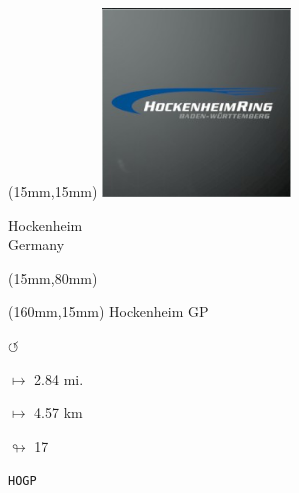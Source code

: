 \begin{textblock*}{50mm}(15mm,15mm)%
\includegraphics[width=50mm]{LG/2015-05-20_00082.png}
\par Hockenheim\\ Germany
\end{textblock*}
\begin{textblock*}{185mm}(15mm,80mm)%
\end{textblock*}
\begin{textblock*}{40mm}(160mm,15mm)%
Hockenheim GP
\par \Huge$\circlearrowleft$
\Large
\par$\mapsto$ 2.84 mi.
\par$\mapsto$ 4.57 km
\par$\looparrowright$ 17
\par\hfill\tiny\tt HOGP\\
\end{textblock*}
\null\newpage

